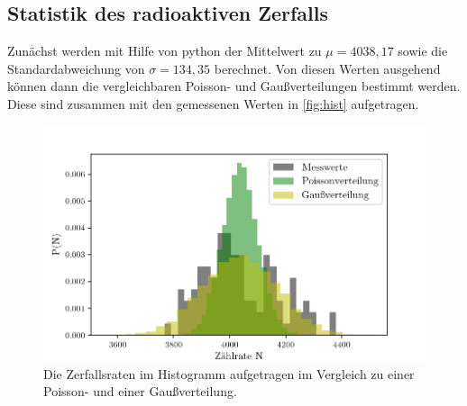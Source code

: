 \subsection{Statistik des radioaktiven Zerfalls}
Zunächst werden mit Hilfe von python \cite{numpy} der Mittelwert zu $\mu = 4038,17$ sowie die Standardabweichung von
$\sigma = 134,35$ berechnet. 
Von diesen Werten ausgehend können dann die vergleichbaren Poisson- und Gaußverteilungen 
bestimmt werden.\\
Diese sind zusammen mit den gemessenen Werten in \autoref{fig:hist} aufgetragen.

\begin{figure}[H]
  \centering
  \includegraphics[width = \textwidth]{content/histogramm.png}
  \caption{Die Zerfallsraten im Histogramm aufgetragen im Vergleich zu einer
  Poisson- und einer Gaußverteilung.}
  \label{fig:hist}
\end{figure}

